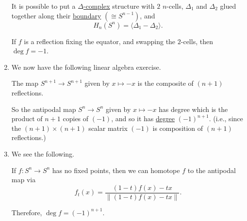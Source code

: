 \begin{remark}
\begin{enumerate}
		      \begin{exercise}
			      It is possible to put a \hyperref[def:delta-complex]{\(\Delta\)-complex} structure with \(2\) \(n\)-cells, \(\Delta_1\) and \(\Delta_2\) glued
			      together along their \hyperref[def:boundary]{boundary} \((\cong S^{n-1})\), and
			      \[
				      H_n(S^n) = \langle \Delta_1 - \Delta_2 \rangle .
			      \]
		      \end{exercise}
		      If \(f\) is a reflection fixing the equator, and swapping the \(2\)-cells, then \(\deg f = -1\).
		      \begin{figure}[H]
			      \centering
			      \label{fig:reflection-about-equator}
		      \end{figure}
		\item We now have the following linear algebra exercise.
		      \begin{exercise}
			      The map \(S^{n + 1} \to S^{n + 1}\) given by \(x \mapsto -x\) is the composite of \((n + 1)\) reflections.
		      \end{exercise}
		      So the antipodal map \(S^n \to S^n\) given by \(x \mapsto -x\) has degree which is the product of \(n + 1\) copies of \((-1)\), and so it has
		      \hyperref[def:degree]{degree} \((-1)^{n + 1}\). (i.e., since the \((n+1)\times (n+1)\) scalar matrix \((-1)\) is composition of \((n+1)\) reflections.)
		\item We see the following.
		      \begin{exercise}
			      If \(f\colon S^n \to S^n\) has no fixed points, then we can homotope \(f\) to the antipodal map via
			      \[
				      f_t(x) = \frac{(1 - t)f(x) - tx}{\left\lVert (1 - t)f(x) - tx\right\rVert}.
			      \]
		      \end{exercise}

		      Therefore, \(\deg f = (-1)^{n + 1}\).
	\end{enumerate}
\end{remark}